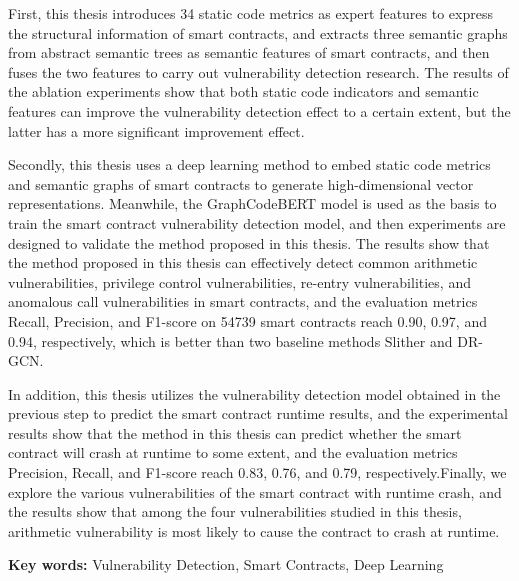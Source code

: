 First, this thesis introduces 34 static code metrics as expert features to express the structural information of smart contracts, and extracts three semantic graphs from abstract semantic trees as semantic features of smart contracts, and then fuses the two features to carry out vulnerability detection research. The results of the ablation experiments show that both static code indicators and semantic features can improve the vulnerability detection effect to a certain extent, but the latter has a more significant improvement effect.

Secondly, this thesis uses a deep learning method to embed static code metrics and semantic graphs of smart contracts to generate high-dimensional vector representations. Meanwhile, the GraphCodeBERT model is used as the basis to train the smart contract vulnerability detection model, and then experiments are designed to validate the method proposed in this thesis. The results show that the method proposed in this thesis can effectively detect common arithmetic vulnerabilities, privilege control vulnerabilities, re-entry vulnerabilities, and anomalous call vulnerabilities in smart contracts, and the evaluation metrics Recall, Precision, and F1-score on \num{54739} smart contracts reach 0.90, 0.97, and 0.94, respectively, which is better than two baseline methods Slither and DR-GCN.
    
In addition, this thesis utilizes the vulnerability detection model obtained in the previous step to predict the smart contract runtime results, and the experimental results show that the method in this thesis can predict whether the smart contract will crash at runtime to some extent, and the evaluation metrics Precision, Recall, and F1-score reach 0.83, 0.76, and 0.79, respectively.Finally, we explore the various vulnerabilities of the smart contract with runtime crash, and the results show that among the four vulnerabilities studied in this thesis, arithmetic vulnerability is most likely to cause the contract to crash at runtime.

\hspace*{\fill}

\noindent \textbf{Key words: } Vulnerability Detection, Smart Contracts, Deep Learning
